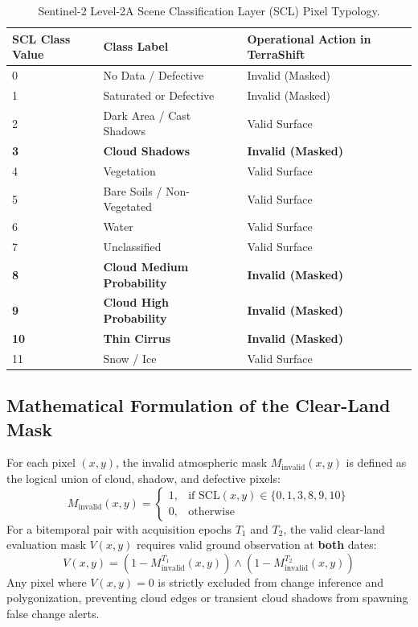 \begin{table}[htbp]
\centering
\caption{Sentinel-2 Level-2A Scene Classification Layer (SCL) Pixel Typology.}
\label{tab:scl_classes}
\begin{tabular}{@{}lll@{}}
\toprule
\textbf{SCL Class Value} & \textbf{Class Label} & \textbf{Operational Action in TerraShift} \\
\midrule
0 & No Data / Defective & Invalid (Masked) \\
1 & Saturated or Defective & Invalid (Masked) \\
2 & Dark Area / Cast Shadows & Valid Surface \\
\textbf{3} & \textbf{Cloud Shadows} & \textbf{Invalid (Masked)} \\
4 & Vegetation & Valid Surface \\
5 & Bare Soils / Non-Vegetated & Valid Surface \\
6 & Water & Valid Surface \\
7 & Unclassified & Valid Surface \\
\textbf{8} & \textbf{Cloud Medium Probability} & \textbf{Invalid (Masked)} \\
\textbf{9} & \textbf{Cloud High Probability} & \textbf{Invalid (Masked)} \\
\textbf{10} & \textbf{Thin Cirrus} & \textbf{Invalid (Masked)} \\
11 & Snow / Ice & Valid Surface \\
\bottomrule
\end{tabular}
\end{table}

\subsection{Mathematical Formulation of the Clear-Land Mask}
For each pixel $(x, y)$, the invalid atmospheric mask $M_{\text{invalid}}(x, y)$ is defined as the logical union of cloud, shadow, and defective pixels:
\begin{equation}
    M_{\text{invalid}}(x, y) = \begin{cases} 
        1, & \text{if } \text{SCL}(x, y) \in \{0, 1, 3, 8, 9, 10\} \\ 
        0, & \text{otherwise} 
    \end{cases}
    \label{eq:scl_mask}
\end{equation}
For a bitemporal pair with acquisition epochs $T_1$ and $T_2$, the valid clear-land evaluation mask $V(x, y)$ requires valid ground observation at \textbf{both} dates:
\begin{equation}
    V(x, y) = \left(1 - M_{\text{invalid}}^{T_1}(x, y)\right) \land \left(1 - M_{\text{invalid}}^{T_2}(x, y)\right)
    \label{eq:bitemporal_validity}
\end{equation}
Any pixel where $V(x, y) = 0$ is strictly excluded from change inference and polygonization, preventing cloud edges or transient cloud shadows from spawning false change alerts.

